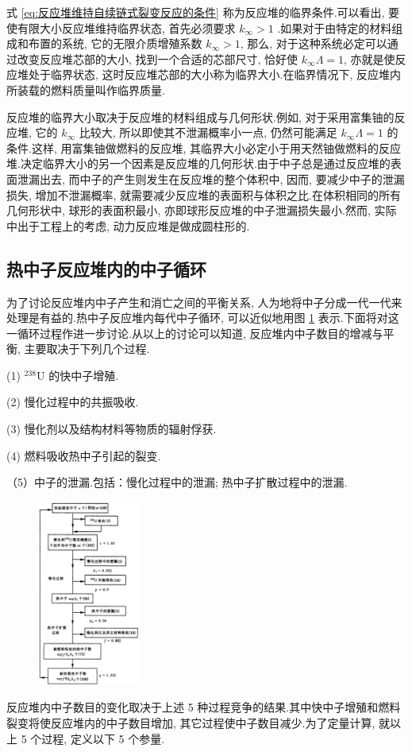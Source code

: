 \documentclass{Sichuan Normal University}
\begin{document}
式 \eqref{eq:反应堆维持自续链式裂变反应的条件} 称为反应堆的临界条件.可以看出, 要使有限大小反应堆维持临界状态, 首先必须要求 $k_{\infty}>1$ .如果对于由特定的材料组成和布置的系统, 它的无限介质增殖系数 $k_{\infty}>1$, 那么, 对于这种系统必定可以通过改变反应堆芯部的大小, 找到一个合适的芯部尺寸, 恰好使 $k_{\infty} \Lambda=1$, 亦就是使反应堆处于临界状态, 这时反应堆芯部的大小称为临界大小.在临界情况下, 反应堆内所装载的燃料质量叫作临界质量.

反应堆的临界大小取决于反应堆的材料组成与几何形状.例如, 对于采用富集铀的反应堆, 它的 $k_{\infty}$ 比较大, 所以即使其不泄漏概率小一点, 仍然可能满足 $k_{\infty} \Lambda=1$ 的条件.这样, 用富集铀做燃料的反应堆, 其临界大小必定小于用天然铀做燃料的反应堆.决定临界大小的另一个因素是反应堆的几何形状.由于中子总是通过反应堆的表面泄漏出去, 而中子的产生则发生在反应堆的整个体积中, 因而, 要减少中子的泄漏损失, 增加不泄漏概率, 就需要减少反应堆的表面积与体积之比.在体积相同的所有几何形状中, 球形的表面积最小, 亦即球形反应堆的中子泄漏损失最小.然而, 实际中出于工程上的考虑, 动力反应堆是做成圆柱形的.
\subsection{热中子反应堆内的中子循环}
为了讨论反应堆内中子产生和消亡之间的平衡关系, 人为地将中子分成一代一代来处理是有益的.热中子反应堆内每代中子循环, 可以近似地用图 \ref{fig:热中子反应堆内的中子平衡} 表示.下面将对这一循环过程作进一步讨论.从以上的讨论可以知道, 反应堆内中子数目的增减与平衡, 主要取决于下列几个过程.

(1) ${ }^{238} \mathrm{U}$ 的快中子增殖.

(2) 慢化过程中的共振吸收.

(3) 慢化剂以及结构材料等物质的辐射俘获.

(4) 燃料吸收热中子引起的裂变.

（5）中子的泄漏.包括：慢化过程中的泄漏; 热中子扩散过程中的泄漏.

\begin{figure}
    \centering
    \includegraphics[width=0.3\textwidth]{./figure/热中子反应堆内的中子平衡.png} %
    \vspace{3mm}
    \label{fig:热中子反应堆内的中子平衡}
  \end{figure}
反应堆内中子数目的变化取决于上述 5 种过程竞争的结果.其中快中子增殖和燃料裂变将使反应堆内的中子数目增加, 其它过程使中子数目减少.为了定量计算, 就以上 5 个过程, 定义以下 5 个参量.
\end{document}
